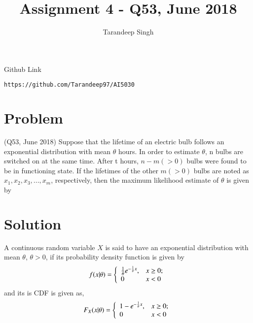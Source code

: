\documentclass[journal,12pt,twocolumn]{IEEEtran}
\begin{document}
     \def\rightbox#1{\makebox[0in][r]{#1}}
     \def\centbox#1{\makebox[0in]{#1}}
     \def\topbox#1{\raisebox{-\baselineskip}[0in][0in]{#1}}
     \def\midbox#1{\raisebox{-0.5\baselineskip}[0in][0in]{#1}}
\vspace{3cm}
\title{Assignment 4 - Q53, June 2018}
\author{Tarandeep Singh}
\maketitle
\newpage
\bigskip
\renewcommand{\thefigure}{\theenumi}
\renewcommand{\thetable}{\theenumi}
Github Link
\begin{lstlisting}
https://github.com/Tarandeep97/AI5030
\end{lstlisting}
\section{Problem}
(Q53, June 2018) Suppose that the lifetime of an electric bulb follows an exponential distribution with mean $\theta$ hours. In order to estimate $\theta$, n bulbs are switched on at the same time. After t hours, $n-m(>0)$ bulbs were found to be in functioning state. If the lifetimes of the other $m(>0)$ bulbs are noted as $x_{1},x_{2},x_{3},...,x_{m}$, respectively, then the maximum likelihood estimate of $\theta$ is given by
\section{Solution}
A continuous random variable $X$ is said to have an exponential distribution with mean $\theta$, $\theta>0$, if its probability density function is given by
\\
\begin{equation*} f(x|\theta) =\left\{ \begin{array}{ll} \frac{1}{\theta} e^{-\frac{1}{\theta} x}, & \hbox{$x\geq0$;} \\ 0 & \hbox{$x<0$} \end{array} \right. \end{equation*}
and its is CDF is given as,
\\
\begin{equation*} F_{X}(x|\theta) =\left\{ \begin{array}{ll} 1- e^{-\frac{1}{\theta} x}, & \hbox{$x\geq0$;} \\ 0 & \hbox{$x<0$} \end{array} \right. \end{equation*}
\end{document}
